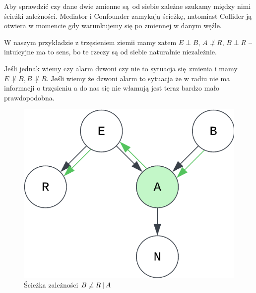 
Aby sprawdzić czy dane dwie zmienne są od siebie zależne szukamy między nimi ścieżki zależności. Mediator i Confounder zamykają ścieżkę, natomiast Collider ją otwiera w momencie gdy warunkujemy się po zmiennej w danym węźle.

W naszym przykładzie z trzęsieniem ziemii mamy zatem \( E \perp B \), \( A \not \perp R \), \( B \perp R \) -- intuicyjne ma to sens, bo te rzeczy są od siebie naturalnie niezależnie.

Jeśli jednak wiemy czy alarm dzwoni czy nie to sytuacja się zmienia i mamy \( E \not \perp B, B \not \perp R \).  Jeśli wiemy że dzwoni alarm to sytuacja że w radiu nie ma informacji o trzęsieniu a do nas się nie włamują jest teraz bardzo mało prawdopodobna.

\begin{figure}[H]
	\centering
	\includegraphics{chapters/graphical models/img/example-path.png}
	\caption{Ścieżka zależności \( B \not \perp R \:\vert\: A \)}
\end{figure}